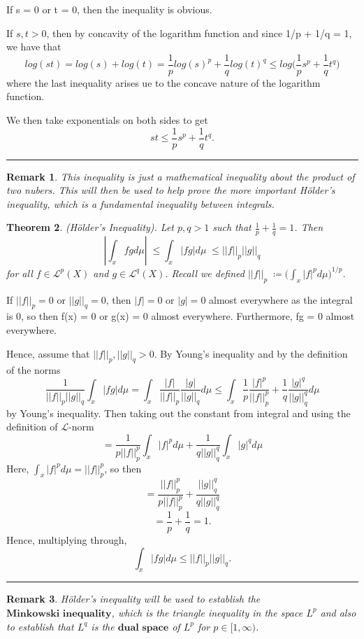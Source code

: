 \documentclass[twoside]{article}
\newcounter{lecnum}
\newtheorem{theorem}{Theorem}[lecnum]
\newtheorem{remark}[theorem]{Remark}
\newenvironment{proof}{{\bf Proof:}}{\hfill\rule{2mm}{2mm}}
\begin{document}
\begin{proof}
If s = 0 or t = 0, then the inequality is obvious.

If $s,t > 0$, then by concavity of the logarithm function and since 1/p + 1/q = 1, we have that 
$$
log(st) = log(s) + log(t) = \frac{1}{p}log(s)^p + \frac{1}{q}log(t)^q \leq log\big(\frac{1}{p}s^p + \frac{1}{q}t^q\big)
$$
where the last inequality arises ue to the concave nature of the logarithm function.

We then take exponentials on both sides to get
$$
st \leq \frac{1}{p}s^p + \frac{1}{q}t^q.
$$
\end{proof}

\begin{remark}
This inequality is just a mathematical inequality about the product of two nubers. This will then be used to help prove the more important Hölder's inequality, which is a fundamental inequality between integrals.
\end{remark}

\begin{theorem}(Hölder's Inequality). Let $p,q > 1$ such that $\frac{1}{p} + \frac{1}{q} = 1$. Then
$$
|\int_xfgd\mu|\; \leq \int_x|fg|d\mu \;\leq ||f||_p||g||_q
$$ 
for all $f \in \mathcal{L}^p(X)$ and $g \in \mathcal{L}^q(X)$. Recall we defined $||f||_p \;\coloneqq \big(\int_x|f|^pd\mu\big)^{1/p}$.
\end{theorem}

\begin{proof}If $||f||_p = 0$ or $||g||_q = 0$, then $|f| = 0$ or $|g| = 0$ almost everywhere as the integral is 0, so then f(x) = 0 or g(x) = 0 almost everywhere. Furthermore, fg = 0 almost everywhere.

Hence, assume that $||f||_p, ||g||_q > 0$. By Young's inequality and by the definition of the norms
$$
\frac{1}{||f||_p||g||_q}\int_x|fg|d\mu = \int_x\frac{|f|}{||f||_p}\frac{|g|}{||g||_q}d\mu \leq \int_x\frac{1}{p}\frac{|f|^p}{||f||_p^p} + \frac{1}{q}\frac{|g|^q}{||g||_q^q}d\mu
$$
by Young's inequality. Then taking out the constant from integral and using the definition of $\mathcal{L}$-norm
$$
= \frac{1}{p||f||_p^p}\int_x|f|^pd\mu + \frac{1}{q||g||_q^q}\int_x|g|^qd\mu
$$
Here, $\int_x|f|^pd\mu = ||f||_p^p$, so then
$$
= \frac{||f||_p^p}{p||f||_p^p} + \frac{||g||_q^q}{q||g||_q^q}
$$
$$
= \frac{1}{p} + \frac{1}{q} = 1.
$$
Hence, multiplying through,
$$
\int_x|fg|d\mu \leq ||f||_p||g||_q.
$$
\end{proof}

\begin{remark} 
Hölder's inequality will be used to establish the $\textbf{Minkowski inequality}$, which is the triangle inequality in the space $L^p$ and also to establish that $L^q$ is the $\textbf{dual space}$ of $L^p$ for $p \in [1,\infty)$.
\end{remark}
\end{document}
